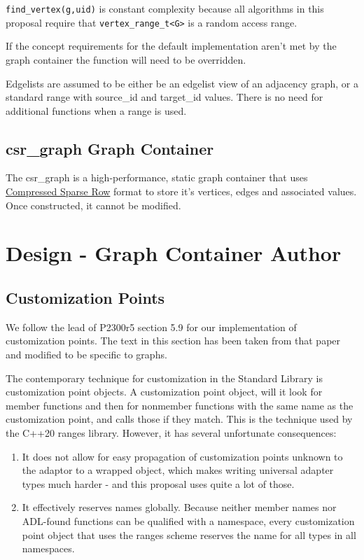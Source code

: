 \documentclass[10pt,onecolumn]{article}
\newcommand{\tcode}[1]{\lstinline[breaklines=true]{#1}}
\begin{document}
\tcode{find_vertex(g,uid)} is constant complexity because all algorithms in this proposal require that \tcode{vertex_range_t<G>} is a random access range. 

If the concept requirements for the default implementation aren't met by the graph container the function will need to be overridden.

Edgelists are assumed to be either be an edgelist view of an adjacency graph, or a standard range with source\_id and target\_id values. There is no need for additional functions when a range is used.

\subsection{csr\_graph Graph Container}
The csr\_graph is a high-performance, static graph container that uses \href{https://en.wikipedia.org/wiki/Sparse_matrix#Compressed_sparse_row_\%28CSR\%2C_CRS_or_Yale_format\%29}{Compressed Sparse Row} format to store it's vertices, edges and associated values. Once constructed, it cannot be modified.

\section{Design - Graph Container Author}
\subsection{Customization Points}
We follow the lead of P2300r5 \cite{REF_P2300r5} section 5.9 for our implementation of customization points. The text in this section has been taken from that paper and modified to be specific to graphs.

The contemporary technique for customization in the Standard Library is customization point objects. A customization point object, will it look for member functions and then for nonmember functions with the same name as the customization point, and calls those if they match. This is the technique used by the C++20 ranges library. However, it has several unfortunate consequences:

\begin{enumerate}
\item It does not allow for easy propagation of customization points unknown to the adaptor to a wrapped object, which makes writing 
universal adapter types much harder - and this proposal uses quite a lot of those.

\item It effectively reserves names globally. Because neither member names nor ADL-found functions can be qualified with a namespace, 
every customization point object that uses the ranges scheme reserves the name for all types in all namespaces.
\end{enumerate}
\end{document}
